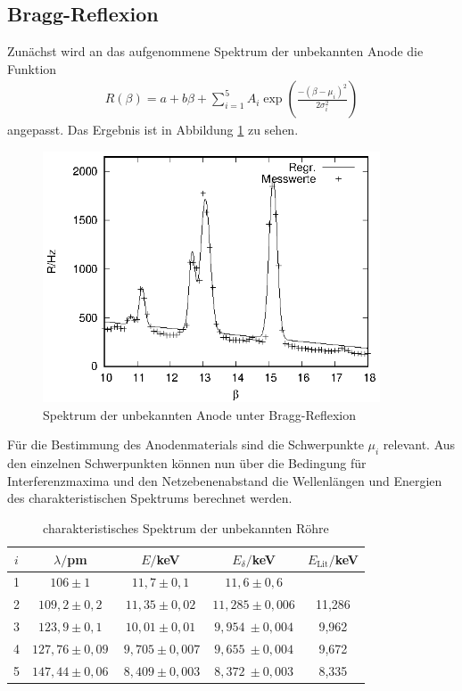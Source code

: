 \subsection{Bragg-Reflexion}
Zunächst wird an das aufgenommene Spektrum der unbekannten Anode die Funktion
\begin{align*}
  R(\beta)=a+b\beta+\sum_{i=1}^5 A_i\exp \left(  \frac{-(\beta-\mu_i)^2}{2\sigma_i^2}\right)
\end{align*}
angepasst. Das Ergebnis ist in Abbildung \ref{fig:anode} zu sehen. 

\begin{figure}[h]
  \centering
  \includegraphics[width=10cm]{data/Bragg/anode.eps}
  \caption{Spektrum der unbekannten Anode unter Bragg-Reflexion}
  \label{fig:anode}
\end{figure}

Für die Bestimmung des Anodenmaterials sind die Schwerpunkte $\mu_i$ relevant. Aus den einzelnen Schwerpunkten können nun über die Bedingung für Interferenzmaxima und den Netzebenenabstand die Wellenlängen und Energien des charakteristischen Spektrums berechnet werden.

\begin{table}[h]
  \centering
  \caption{charakteristisches Spektrum der unbekannten Röhre}
  \label{tab:spektrum_anode}
  \begin{tabular}{c c c c c}
    \toprule
    $i$ & $\lambda/$pm & $E/$keV & $E_\delta/$keV & $E_\mathrm{Lit}/$keV\\
    \midrule
    1   & $106 \pm 1$ & $11,7 \pm 0,1$ & $11,6 \pm 0,6$ & \\
    2   & $109,2 \pm 0,2$ & $11,35 \pm 0,02$ & $11,285 \pm 0,006$ & 11,286\\
    3   & $123,9 \pm 0,1$ & $10,01 \pm 0,01$ & $9,954 \ \pm 0,004$ & 9,962\\
    4   & $127,76 \pm 0,09$ & $\ 9,705 \pm 0,007$ & $9,655 \ \pm 0,004$ & 9,672\\
    5   & $147,44 \pm 0,06$ & $\ 8,409 \pm 0,003$ & $8,372 \ \pm 0,003$ & 8,335\\
    \bottomrule
  \end{tabular}
\end{table}

